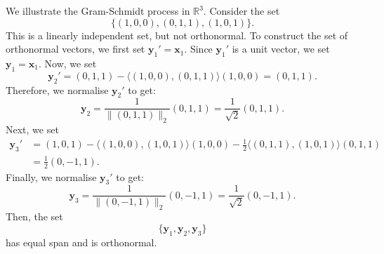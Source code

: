 \documentclass[a4paper, openany]{memoir}
\theoremstyle{definition}
\theoremstyle{plain}
\begin{document}
    We illustrate the Gram-Schmidt process in $\mathbb{R}^3$. Consider the set
    \[\{(1, 0, 0), (0, 1, 1), (1, 0, 1)\}.\]
    This is a linearly independent set, but not orthonormal. To construct the set of orthonormal vectors, we first set $\bm{y}_1' = \bm{x}_1$. Since $\bm{y}_1'$ is a unit vector, we set $\bm{y}_1 = \bm{x}_1$. Now, we set
    \[\bm{y}_2' = (0, 1, 1) - \langle (1, 0, 0), (0, 1, 1) \rangle (1, 0, 0) = (0, 1, 1).\]
    Therefore, we normalise $\bm{y}_2'$ to get:
    \[\bm{y}_2 = \frac{1}{\lVert (0, 1, 1) \rVert_2} (0, 1, 1) = \frac{1}{\sqrt{2}} (0, 1, 1).\]
    Next, we set
    \begin{align*}
        \bm{y}_3' &= (1, 0, 1) - \langle (1, 0, 0), (1, 0, 1) \rangle (1, 0, 0) - \frac{1}{2} \langle (0, 1, 1), (1, 0, 1) \rangle (0, 1, 1) \\
        &= \frac{1}{2} (0, -1, 1).
    \end{align*}
    Finally, we normalise $\bm{y}_3'$ to get:
    \[\bm{y}_3 = \frac{1}{\lVert (0, -1, 1) \rVert_2} (0, -1, 1) = \frac{1}{\sqrt{2}} (0, -1, 1).\]
    Then, the set
    \[\{\bm{y}_1, \bm{y}_2, \bm{y}_3\}\]
    has equal span and is orthonormal.
\end{document}
